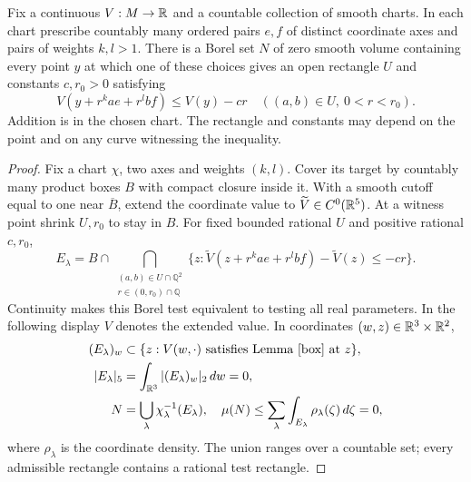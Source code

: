 \begin{lemma}\label{planes}
Fix a continuous $V:M\to\mathbb R$ and a countable collection of smooth charts.
In each chart prescribe countably many ordered pairs $e,f$ of distinct
coordinate axes and pairs of weights $k,l>1$. There is a Borel set $N$
of zero smooth volume containing every point $y$ at which one of these
choices gives an open rectangle $U$ and constants $c,r_0>0$ satisfying
\[
 V(y+r^k a e+r^l b f)\le V(y)-cr
 \quad((a,b)\in U,\ 0<r<r_0).
\]
Addition is in the chosen chart. The rectangle and constants may depend
on the point and on any curve witnessing the inequality.
\end{lemma}
\begin{proof}
Fix a chart $\chi$, two axes and weights $(k,l)$. Cover its target by
countably many product boxes $B$ with compact closure inside it. With a
smooth cutoff equal to one near $\overline B$, extend the coordinate
value to $\widetilde V\in C^0(\mathbb R^5)$. At a witness point shrink $U,r_0$
to stay in $B$. For fixed bounded rational $U$ and positive rational $c,r_0$,
\[
 E_\lambda=B\cap
 \bigcap_{\substack{(a,b)\in U\cap\mathbb Q^2\\r\in(0,r_0)\cap\mathbb Q}}
 \{z:\widetilde V(z+r^kae+r^lbf)-\widetilde V(z)\le-cr\}.
\]
Continuity makes this Borel test equivalent to testing all real parameters.
In the following display $V$ denotes the extended value. In coordinates $(w,z)\in\mathbb R^3\times\mathbb R^2$,
\[
 \begin{aligned}
 (E_\lambda)_w&\subset\{z:V(w,\cdot)\text{ satisfies Lemma~\ref{box} at }z\},\\
 |E_\lambda|_5&=\int_{\mathbb R^3}|(E_\lambda)_w|_2\,dw=0,\\
 N&=\bigcup_{\lambda}\chi_\lambda^{-1}(E_\lambda),\quad
 \mu(N)\le\sum_{\lambda}\int_{E_\lambda}\rho_\lambda(\zeta)\,d\zeta=0 ,
 \end{aligned}
\]
where $\rho_\lambda$ is the coordinate density. The union ranges over a
countable set; every admissible rectangle contains a rational test rectangle.
\end{proof}
